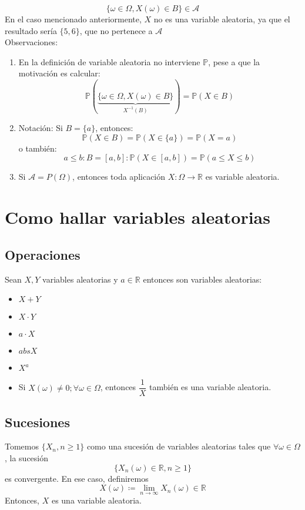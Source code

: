 \documentclass[11pt]{article}
\newcommand{\R}{\mathbb{R}}
\newcommand{\prob}{\mathbb{P}}
\newcommand{\omg}{\omega}
\newcommand{\OMG}{\varOmega}
\theoremstyle{plain}
\begin{document}
        \[\{\omega\in\OMG, X(\omega) \in B\} \in \mathcal{A}\]
        En el caso mencionado anteriormente, $X$ no es una variable aleatoria, ya que el resultado sería $\{5,6\}$, que no pertenece a $\mathcal{A}$\\
        Observaciones:
        \begin{enumerate}
            \item En la definición de variable aleatoria no interviene $\prob$, pese a que la motivación es calcular:
            \[\prob(\underbrace{\{\omega\in\OMG, X(\omega) \in B\}}_{X^{-1}(B)}) = \prob(X\in B)\]
            \item Notación: Si $B = \{a\}$, entonces:\[\prob(X\in B) = \prob(X\in\{a\}) = \prob(X=a)\] o también:
            \[a \le b: B = [a,b]: \prob(X\in [a,b]) = \prob(a\le X\le b)\]
            \item Si $\mathcal{A} = P(\OMG)$, entonces toda aplicación $X : \OMG \rightarrow \R$ es variable aleatoria.
        \end{enumerate}
    \section{Como hallar variables aleatorias} %
    \label{sec:como_hallar_variables_aleatorias}
        \subsection{Operaciones} %
        \label{sub:operaciones}
            Sean $X,Y$ variables aleatorias y $a\in\R$ entonces son variables aleatorias:
            \begin{itemize}
                \item $X + Y$
                \item $X \cdot Y$
                \item $a\cdot X$
                \item $abs{X}$
                \item $X^a$
                \item Si $X(\omega)\ne 0; \forall \omega \in \OMG$, entonces $\dfrac{1}{X}$ también es una variable aleatoria.
            \end{itemize}
        \subsection{Sucesiones} %
        \label{sub:sucesiones}
            Tomemos $\{X_n, n\ge1\}$ como una sucesión de variables aleatorias tales que $\forall \omega \in \OMG$, la sucesión
            \[\{X_n(\omg)\in \R, n\ge1\}\]
            es convergente. En ese caso, definiremos\[X(\omega) \coloneqq \lim_{n\to\infty}X_n(\omega) \in \R\]
            Entonces, $X$ es una variable aleatoria.
\end{document}
